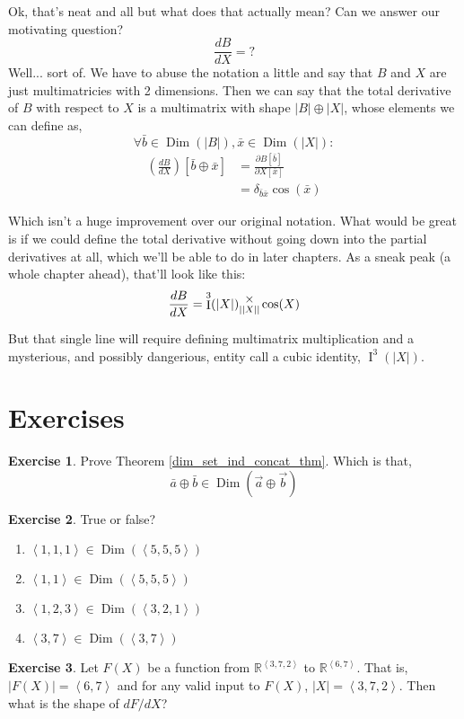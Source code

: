 \documentclass[12pt]{book}
\theoremstyle{plain}
\theoremstyle{definition}
\newtheorem{exercise}{Exercise}[chapter]
\theoremstyle{ppart}
\theoremstyle{case}
\theoremstyle{solution}
\DeclareMathOperator{\Dim}{Dim}
\DeclareMathOperator{\Ident}{I}
\newcommand{\mmult}[1]{\text{\raisebox{1ex}{$\underset{#1}{\times}$}}}
\begin{document}
Ok, that's neat and all but what does that actually mean? Can we answer our motivating 
question?
\[\frac{dB}{dX} = ? \]
Well... sort of. We have to abuse the notation a little and say that $B$ and $X$ are
just multimatricies with 2 dimensions. Then we can say that the total derivative
of $B$ with respect to $X$ is a multimatrix with shape $|B| \oplus |X|$,
whose elements we can define as,
\[\forall \bar{b} \in \Dim(|B|), \bar{x} \in \Dim(|X|):\]
\begin{align*}
\left( \frac{dB}{dX} \right)[\bar{b} \oplus \bar{x}]
&= \frac{\partial B[\bar{b}]}{\partial X[\bar{x}]} \\
&= \delta_{\bar{b}\bar{x}}\cos(\bar{x})
\end{align*}

Which isn't a huge improvement over our original notation. What would be great is
if we could define the total derivative without going down into the partial derivatives
at all, which we'll be able to do in later chapters. As a sneak peak (a whole
chapter ahead), that'll look like this:
\[
\frac{dB}{dX} = \Ident^3(|X|) \mmult{||X||} \cos(X)
\]

But that single line will require defining multimatrix multiplication and
a mysterious, and possibly dangerious, entity call a cubic identity, $\Ident^3(|X|)$.

\section{Exercises}

\begin{exercise}
\label{dim_set_ind_concat_ex}
Prove Theorem \ref{dim_set_ind_concat_thm}. Which is that,
\[ \bar{a} \oplus \bar{b} \in \Dim(\vec{a} \oplus \vec{b}) \]
\end{exercise}

\begin{exercise}
True or false?
\begin{enumerate}
\item $\left<1,1,1\right> \in \Dim(\left<5,5,5\right>)$
\item $\left<1,1\right> \in \Dim(\left<5,5,5\right>)$
\item $\left<1,2,3\right> \in \Dim(\left<3,2,1\right>)$
\item $\left<3,7\right> \in \Dim(\left<3,7\right>)$
\end{enumerate}
\end{exercise}

\begin{exercise}
Let $F(X)$ be a function from $\mathbb{R}^{\left<3,7,2\right>}$ to
$\mathbb{R}^{\left<6, 7\right>}$. That is, $|F(X)| = \left<6,7\right>$
and for any valid input to $F(X)$, $|X| = \left<3,7,2\right>$.
Then what is the shape of $dF/dX$?
\end{exercise}
\end{document}
